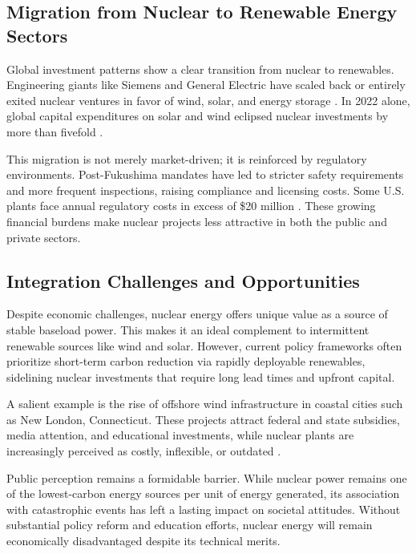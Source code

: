 \documentclass[12pt]{article}
\begin{document}
\subsection{Migration from Nuclear to Renewable Energy Sectors}

Global investment patterns show a clear transition from nuclear to renewables. Engineering giants like Siemens and General Electric have scaled back or entirely exited nuclear ventures in favor of wind, solar, and energy storage \autocite{iea2020}. In 2022 alone, global capital expenditures on solar and wind eclipsed nuclear investments by more than fivefold \autocite{wnisr2022}.

This migration is not merely market-driven; it is reinforced by regulatory environments. Post-Fukushima mandates have led to stricter safety requirements and more frequent inspections, raising compliance and licensing costs. Some U.S. plants face annual regulatory costs in excess of \$20 million \autocite{aafnuclearcosts}. These growing financial burdens make nuclear projects less attractive in both the public and private sectors.

\subsection{Integration Challenges and Opportunities}

Despite economic challenges, nuclear energy offers unique value as a source of stable baseload power. This makes it an ideal complement to intermittent renewable sources like wind and solar. However, current policy frameworks often prioritize short-term carbon reduction via rapidly deployable renewables, sidelining nuclear investments that require long lead times and upfront capital.

A salient example is the rise of offshore wind infrastructure in coastal cities such as New London, Connecticut. These projects attract federal and state subsidies, media attention, and educational investments, while nuclear plants are increasingly perceived as costly, inflexible, or outdated \autocite{abdussami2025future}.

Public perception remains a formidable barrier. While nuclear power remains one of the lowest-carbon energy sources per unit of energy generated, its association with catastrophic events has left a lasting impact on societal attitudes. Without substantial policy reform and education efforts, nuclear energy will remain economically disadvantaged despite its technical merits.
\end{document}
